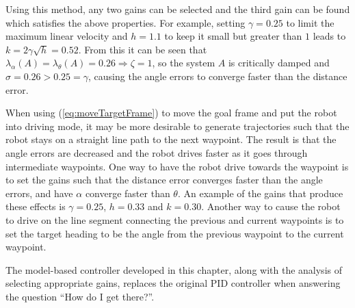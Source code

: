 Using this method, any two gains can be selected and the third gain can be found which satisfies the above properties.
For example, setting $\gamma=0.25$ to limit the maximum linear velocity and $h=1.1$ to keep it small but greater than $1$ leads to $k=2\gamma\sqrt{h}=0.52$.
From this it can be seen that $\lambda_\alpha(A) = \lambda_\theta(A) = 0.26 \Rightarrow \zeta = 1$, so the system $A$ is critically damped and $\sigma = 0.26>0.25=\gamma$, causing the angle errors to converge faster than the distance error.

When using (\ref{eq:moveTargetFrame}) to move the goal frame and put the robot into driving mode, it may be more desirable to generate trajectories such that the robot stays on a straight line path to the next waypoint.
The result is that the angle errors are decreased and the robot drives faster as it goes through intermediate waypoints.
One way to have the robot drive towards the waypoint is to set the gains such that the distance error converges faster than the angle errors, and have $\alpha$ converge faster than $\theta$.
An example of the gains that produce these effects is $\gamma=0.25$, $h=0.33$ and $k=0.30$.
Another way to cause the robot to drive on the line segment connecting the previous and current waypoints is to set the target heading to be the angle from the previous waypoint to the current waypoint.

The model-based controller developed in this chapter, along with the analysis of selecting appropriate gains, replaces the original PID controller when answering the question ``How do I get there?''.
